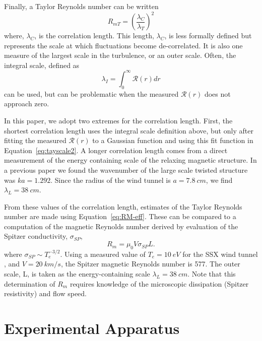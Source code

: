\documentclass[aps,prl,amsmath,amssymb,reprint,superscriptaddress]{revtex4-1} %
\begin{document}
Finally, a Taylor Reynolds number can be written~\cite{frisch95}
%
\begin{equation}
R_{mT}  = \left(\frac{\lambda_{C}}{\lambda_T} \right)^2 
\label{eq:RM-eff}
\end{equation}
%
where, $\lambda_{C}$, is the correlation length. This length, $\lambda_{C}$, is less formally defined but represents the scale at which fluctuations become de-correlated.  It is also one measure of the largest scale in the turbulence, or an outer scale.  Often, the integral scale, defined as
%
\begin{equation}
\lambda_{I}  = \int_0^\infty \mathcal{R}(r) dr
\label{eq:tayscale2}
\end{equation}
%
can be used, but can be problematic when the measured $\mathcal{R}(r)$ does not approach zero. 

In this paper, we adopt two extremes for the correlation length.  First, the shortest correlation length uses the integral scale definition above, but only after fitting the measured $\mathcal{R}(r)$ to a Gaussian function and using this fit function in Equation~\ref{eq:tayscale2}.  A longer correlation length comes from a direct measurement of the energy containing scale of the relaxing magnetic structure.  In a previous paper \cite{Gray13} we found the wavenumber of the large scale twisted structure was $k a = 1.292$.  Since the radius of the wind tunnel is $a = 7.8~cm$, we find $\lambda_{L} =38~cm$.  

From these values of the correlation length, estimates of the Taylor Reynolds number are made using Equation~\ref{eq:RM-eff}. These can be compared to a computation of the magnetic Reynolds number derived by evaluation of the Spitzer conductivity, $\sigma_{SP}$,
\begin{equation}
R_m = \mu_0 V \sigma_{SP} L.
\label{eq:RM-calc} 
\end{equation}
%
where $\sigma_{SP}\sim T_{e}^{-3/2}$. Using a measured value of $T_e = 10~eV$ for the SSX wind tunnel \cite{Zhang11}, and $V=20~km/s$, the Spitzer magnetic Reynolds number is 577. The outer scale, L, is taken as the energy-containing scale $\lambda_{L} = 38~cm$.  Note that this determination of $R_m$ requires knowledge of the microscopic dissipation (Spitzer resistivity) and flow speed.

\section{Experimental Apparatus}
\end{document}
